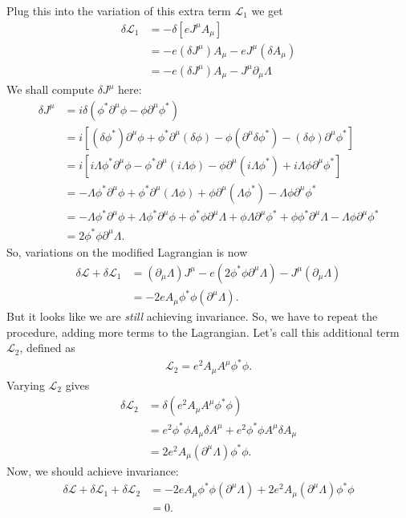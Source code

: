 \documentclass[a4paper,11pt]{article}
\numberwithin{equation}{section}
\theoremstyle{definition}
\newcommand{\p}{\partial}
\newcommand{\lag}{\mathcal{L}}
\begin{document}
Plug this into the variation of this extra term $\lag_1$ we get
\begin{align}
\delta \lag_1&=-\delta[eJ^\mu A_\mu]\\
&= -e(\delta J^\mu)A_\mu -eJ^\mu(\delta A_\mu)\\
&= -e(\delta J^\mu)A_\mu - J^\mu\p_\mu\Lambda
\end{align}
We shall compute $\delta J^\mu$ here:
\begin{align}
\delta J^\mu &= i\delta  (\phi^*\p^\mu\phi - \phi\p^\mu\phi^*)\\
&= i[(\delta\phi^*)\p^\mu\phi + \phi^*\p^\mu(\delta\phi)- \phi(\p^\mu\delta\phi^*) - (\delta\phi)\p^\mu\phi^*]\\
&= i[i\Lambda\phi^*\p^\mu\phi - \phi^*\p^\mu (i\Lambda \phi)- \phi\p^\mu (i\Lambda\phi^*) + i\Lambda\phi\p^\mu\phi^*]\\
&= -\Lambda\phi^*\p^\mu\phi + \phi^*\p^\mu (\Lambda \phi) + \phi\p^\mu (\Lambda\phi^*) - \Lambda\phi\p^\mu\phi^*\\
&= -\Lambda\phi^*\p^\mu\phi + \Lambda\phi^*\p^\mu\phi + \phi^*\phi\p^\mu\Lambda + \phi \Lambda \p^\mu\phi^* + \phi \phi^*\p^\mu\Lambda - \Lambda\phi\p^\mu\phi^*\\
&= 2\phi^*\phi \p^\mu\Lambda.
\end{align}
So, variations on the modified Lagrangian is now
\begin{align}
\delta \lag + \delta \lag_1 &= (\p_\mu\Lambda)J^\mu -e(2\phi^*\phi\p^\mu\Lambda) - J^\mu(\p_\mu\Lambda)\\
&=  -2eA_\mu\phi^*\phi(\p^\mu\Lambda).
\end{align}
But it looks like we are \textit{still} achieving invariance. So, we have to repeat the procedure, adding more terms to the Lagrangian. Let's call this additional term $\lag_2$, defined as
\begin{align}
\lag_2 = e^2 A_\mu A^\mu\phi^*\phi.
\end{align}
Varying $\lag_2$ gives
\begin{align}
\delta \lag_2 &= \delta(e^2 A_\mu A^\mu\phi^*\phi)\\
&= e^2 \phi^*\phi A_\mu\delta A^\mu + e^2 \phi^*\phi A^\mu\delta A_\mu\\
&= 2e^2A_\mu(\p^\mu \Lambda)\phi^*\phi.
\end{align}
Now, we should achieve invariance:
\begin{align}
\delta \lag + \delta \lag_1 + \delta \lag_2 &= -2eA_\mu\phi^*\phi(\p^\mu\Lambda) + 2e^2A_\mu(\p^\mu \Lambda)\phi^*\phi\\
&= 0.
\end{align}
\end{document}
